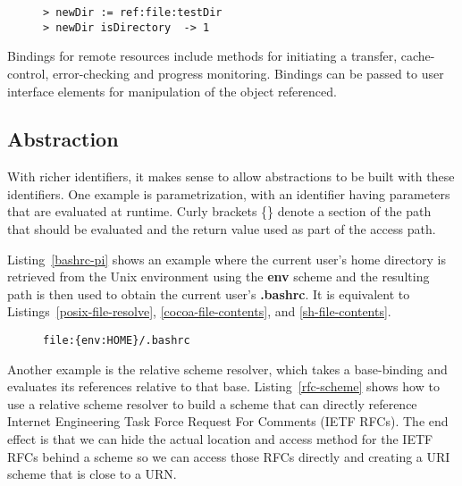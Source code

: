 \documentclass[preprint,authoryear]{acm_proc_article-sp}
\begin{document}
\begin{figure}[htbp]
\begin{lstlisting}[style=L,label=ref-file-dir,caption=File and directory manipulation.]
> newDir := ref:file:testDir 
> newDir isDirectory  -> 1
\end{lstlisting}
\end{figure}

Bindings for remote resources include methods for initiating a transfer, cache-control,
error-checking and progress monitoring.   Bindings can be passed to user interface
elements for manipulation of the object referenced.


\subsection{Abstraction}

With richer identifiers, it makes sense to allow abstractions to be built with these identifiers.
One example is parametrization, with an identifier having parameters that are evaluated
at runtime.  Curly brackets \{\} denote a section of the path that should be evaluated and
the return value used as part of the access path.

Listing~\ref{bashrc-pi} shows an example where the current user's home directory
is retrieved from the Unix environment using the {\bf env} scheme and the resulting
path is then used to obtain the current user's  {\bf .bashrc}.
It is equivalent to Listings~\ref{posix-file-resolve}, \ref{cocoa-file-contents}, and 
\ref{sh-file-contents}.


\begin{figure}[htbp]
\begin{lstlisting}[style=L,label=bashrc-pi,caption=Parametrized identifier.]
  file:{env:HOME}/.bashrc
\end{lstlisting}
\end{figure}

Another example is the relative scheme resolver, which takes a base-binding
and evaluates its references relative to that base.  Listing~\ref{rfc-scheme} shows
how to use a relative scheme resolver to build a scheme that can directly
reference Internet Engineering Task Force Request For Comments (IETF RFCs).
The end effect is that we can hide the actual location and access method for
the IETF RFCs behind a scheme so we can access those RFCs directly and
creating a URI scheme that is close to a URN.
\end{document}
